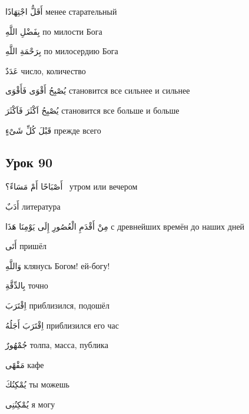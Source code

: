 \documentclass[a5paper]{article}
\newcommand\textstyleDropCaps[1]{#1}
\newcommand\textstyleCaptioncharacters[1]{#1}
\begin{document}
\textstyleCaptioncharacters{أَقَلُّ اجْتِهَادًا }\textstyleDropCaps{менее ста­рательный‎}

\textstyleCaptioncharacters{بِفَضْلِ اللَّهِ }\textstyleDropCaps{по милости Бога‎}

\textstyleCaptioncharacters{بِرَحْمَةِ اللَّهِ }\textstyleDropCaps{по милосер­дию Бога‎}

\textstyleCaptioncharacters{عَدَدٌ }\textstyleDropCaps{число, количество‎}

\textstyleCaptioncharacters{يُصْبِحُ أَقْوَى فَأَقْوَى }\textstyleDropCaps{становится все сильнее и сильнее‎}

\textstyleCaptioncharacters{يُصْبِحُ اَكْثَرَ فَاَكْثَرَ }\textstyleDropCaps{ста­новится все больше и больше‎}

\textstyleCaptioncharacters{قَبْلَ كُلِّ شَىْءٍ }\textstyleDropCaps{прежде всего‎}

\subsection[Урок 90‎]{\textstyleDropCaps{Урок 90‎}}
\textstyleCaptioncharacters{أَصْبَاحًا أَمْ مَسَاءً؟ \ }\textstyleDropCaps{утром или вечером‎}

\textstyleCaptioncharacters{أَدَبٌ }\textstyleDropCaps{литература‎}

\textstyleCaptioncharacters{مِنْ أَقْدَمِ الْعُصُورِ إِلَى يَوْمِنَا هَذَا }\textstyleDropCaps{с древнейших времён до наших дней ‎}

\textstyleCaptioncharacters{أَتَى }\textstyleDropCaps{пришёл‎}

\textstyleCaptioncharacters{وَاللَّهِ }\textstyleDropCaps{клянусь Богом! ей-богу!‎}

\textstyleCaptioncharacters{بِالدِّقَّةِ }\textstyleDropCaps{точно‎}

\textstyleCaptioncharacters{اِقْتَرَبَ }\textstyleDropCaps{приблизился, подо­шёл‎}

\textstyleCaptioncharacters{اِقْتَرَبَ أَجَلُهُ }\textstyleDropCaps{приблизил­ся его час‎}

\textstyleCaptioncharacters{جُمْهُورٌ }\textstyleDropCaps{толпа, масса, пуб­лика‎}

\textstyleCaptioncharacters{مَقْهًى }\textstyleDropCaps{кафе‎}

\textstyleCaptioncharacters{يُمْكِنُكَ }\textstyleDropCaps{ты можешь‎}

\textstyleCaptioncharacters{يُمْكِنُنِى }\textstyleDropCaps{я могу‎}
\end{document}

